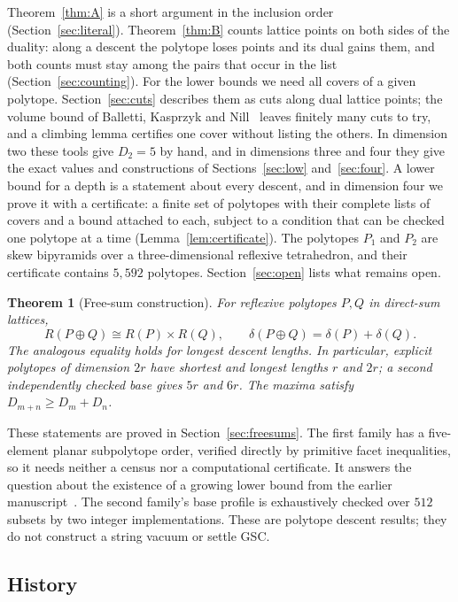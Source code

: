 \documentclass[manuscript]{aomart}
\newtheorem{theorem}{Theorem}
\theoremstyle{definition}
\theoremstyle{remark}
\begin{document}
Theorem~\ref{thm:A} is a short argument in the inclusion order
(Section~\ref{sec:literal}). Theorem~\ref{thm:B} counts lattice points on
both sides of the duality: along a descent the polytope loses points and
its dual gains them, and both counts must stay among the pairs that occur
in the list (Section~\ref{sec:counting}). For the lower bounds we need all
covers of a given polytope. Section~\ref{sec:cuts} describes them as cuts
along dual lattice points; the volume bound of Balletti, Kasprzyk and
Nill~\cite{BKN22} leaves finitely many cuts to try, and a climbing lemma
certifies one cover without listing the others. In dimension two these
tools give $D_2=5$ by hand, and in dimensions three and four they give the
exact values and constructions of Sections~\ref{sec:low}
and~\ref{sec:four}. A lower bound for a depth is a statement about every
descent, and in dimension four we prove it with a certificate: a finite set
of polytopes with their complete lists of covers and a bound attached to
each, subject to a condition that can be checked one polytope at a time
(Lemma~\ref{lem:certificate}). The polytopes $P_1$ and $P_2$ are skew
bipyramids over a three-dimensional reflexive tetrahedron, and their
certificate contains $5{,}592$ polytopes. Section~\ref{sec:open} lists what
remains open.

\begin{theorem}[Free-sum construction]\label{thm:intro-free}
For reflexive polytopes $P,Q$ in direct-sum lattices,
\[
 R(P\oplus Q)\cong R(P)\times R(Q),\qquad
 \delta(P\oplus Q)=\delta(P)+\delta(Q).
\]
The analogous equality holds for longest descent lengths. In particular,
explicit polytopes of dimension $2r$ have shortest and longest lengths
$r$ and $2r$; a second independently checked base gives $5r$ and $6r$.
The maxima satisfy $D_{m+n}\ge D_m+D_n$.
\end{theorem}

These statements are proved in Section~\ref{sec:freesums}. The first
family has a five-element planar subpolytope order, verified directly
by primitive facet inequalities, so it needs neither a census nor a
computational certificate. It answers the question about the existence
of a growing lower bound from the earlier manuscript~\cite{Joint26}.
The second family's base profile is exhaustively checked over $512$
subsets by two integer implementations. These are polytope descent
results; they do not construct a string vacuum or settle GSC.

\subsection*{History}
\end{document}
